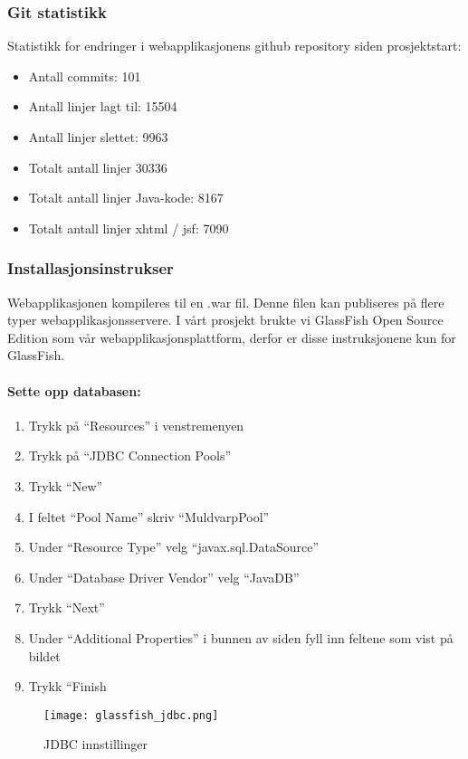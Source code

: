 \documentclass[../main.tex]{subfiles}
\begin{document}
\subsubsection{Git statistikk}

Statistikk for endringer i webapplikasjonens github repository siden prosjektstart:
\begin{itemize}
\item Antall commits: 101
\item Antall linjer lagt til: 15504
\item Antall linjer slettet: 9963
\item Totalt antall linjer 30336
\item Totalt antall linjer Java-kode: 8167
\item Totalt antall linjer xhtml / jsf: 7090
\end{itemize}

\subsubsection{Installasjonsinstrukser}

Webapplikasjonen kompileres til en .war fil. Denne filen kan publiseres på flere typer webapplikasjonsservere. I vårt prosjekt brukte vi GlassFish Open Source Edition som vår webapplikasjonsplattform, derfor er disse instruksjonene kun for GlassFish.

\paragraph{Sette opp databasen:}

\begin{enumerate}
\item Trykk på “Resources” i venstremenyen
\item Trykk på “JDBC Connection Pools”
\item Trykk “New”
\item I feltet “Pool Name” skriv “MuldvarpPool”
\item Under “Resource Type” velg “javax.sql.DataSource”
\item Under “Database Driver Vendor” velg “JavaDB”
\item Trykk “Next”
\item Under “Additional Properties” i bunnen av siden fyll inn feltene som vist på bildet
\item Trykk “Finish
\end{enumerate}

\begin{figure}[H]
  \centering
  \texttt{[image: glassfish\_jdbc.png]}
  \caption{JDBC innstillinger}
\end{figure}
\end{document}
